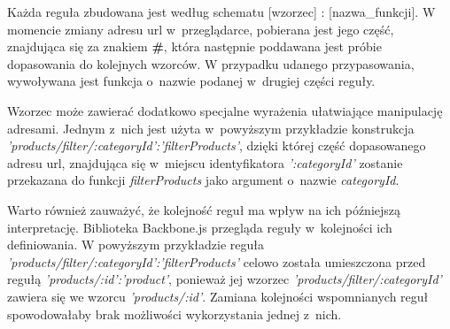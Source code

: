 Każda reguła zbudowana jest według schematu [wzorzec] : [nazwa\_funkcji]. W momencie zmiany adresu url w~przeglądarce, pobierana jest jego część, znajdująca się za znakiem \textbf{\#}, która następnie poddawana jest próbie dopasowania do kolejnych wzorców. W przypadku udanego przypasowania, wywoływana jest funkcja o~nazwie podanej w~drugiej części reguły.

Wzorzec może zawierać dodatkowo specjalne wyrażenia ułatwiające manipulację adresami. Jednym z~nich jest użyta w~powyższym przykładzie konstrukcja \textit{'products/filter/:categoryId':'filterProducts'}, dzięki której część dopasowanego adresu url, znajdująca się w~miejscu identyfikatora \textit{':categoryId'} zostanie przekazana do funkcji \textit{filterProducts} jako argument o~nazwie \textit{categoryId}.

Warto również zauważyć, że kolejność reguł ma wpływ na ich późniejszą interpretację. Biblioteka Backbone.js przegląda reguły w~kolejności ich definiowania. W powyższym przykładzie reguła \textit{'products/filter/:categoryId':'filterProducts'} celowo została umieszczona przed regułą \textit{'products/:id':'product'}, ponieważ jej wzorzec \textit{'products/filter/:categoryId'} zawiera się we wzorcu \textit{'products/:id'}. Zamiana kolejności wspomnianych reguł spowodowałaby brak możliwości wykorzystania jednej z~nich.\cite{backbone}